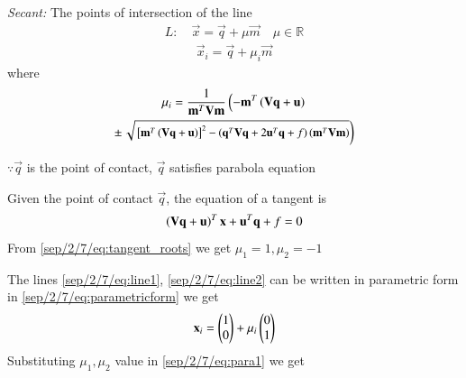 {\em Secant: }The points of intersection of the line 
\begin{align}
L: \quad \vec{x} = \vec{q} + \mu \vec{m} \quad \mu \in \mathbb{R}
\label{sep/2/7/eq:conic_tangent}
\end{align}
\begin{align}\label{sep/2/7/eq:parametricform}
\vec{x}_i = \vec{q} + \mu_i \vec{m}
\end{align}
%
where
\begin{multline}
\mu_i = \frac{1}
{
\mathbf{m}^T\mathbf{V}\mathbf{m}
}
\left(-\mathbf{m}^T\left(\mathbf{V}\mathbf{q}+\mathbf{u}\right)\right.
\\
\pm
{\small
\ensuremath{\left.\sqrt{
{}\left[
\mathbf{m}^T\left(\mathbf{V}\mathbf{q}+\mathbf{u}\right)
\right]^2
-
\left(
\mathbf{q}^T\mathbf{V}\mathbf{q} + 2\mathbf{u}^T\mathbf{q} +f
\right)
\left(\mathbf{m}^T\mathbf{V}\mathbf{m}\right)
}
\right)}
}
\label{sep/2/7/eq:tangent_roots}
\end{multline}
                    
$\because \vec{q}$ is the point of contact, $\vec{q}$ satisfies parabola equation

 
Given the point of contact $\vec{q}$, the equation of a tangent is 
\begin{align}
\left(\mathbf{V}\mathbf{q}+\mathbf{u}\right)^T\mathbf{x}+\mathbf{u}^T\mathbf{q}+f = 0
\label{sep/2/7/eq:conic_tangent_final}
\end{align}
%
From \eqref{sep/2/7/eq:tangent_roots} we get 
$\mu_1= 1, \mu_2= -1$

The lines \eqref{sep/2/7/eq:line1}, \eqref{sep/2/7/eq:line2} can be written in parametric form in \eqref{sep/2/7/eq:parametricform} we get
\begin{align}\label{sep/2/7/eq:para1}
\mathbf{x}_i = \begin{pmatrix} 1\\ 0\end{pmatrix} + \mu_i \begin{pmatrix}0\\1\end{pmatrix}
\end{align}
Substituting $\mu_1, \mu_2$ value in \eqref{sep/2/7/eq:para1} we get

